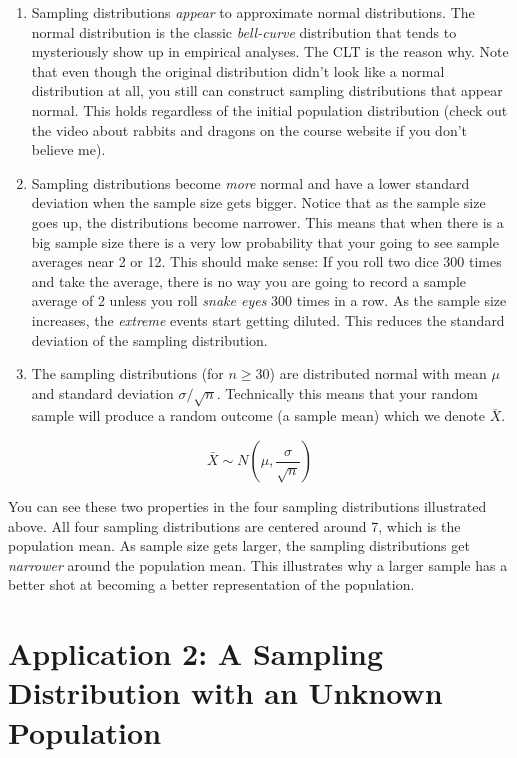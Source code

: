 \documentclass[
]{book}
\begin{document}
\begin{enumerate}
\def\labelenumi{\arabic{enumi}.}
\item
  Sampling distributions \emph{appear} to approximate normal distributions. The normal distribution is the classic \emph{bell-curve} distribution that tends to mysteriously show up in empirical analyses. The CLT is the reason why. Note that even though the original distribution didn't look like a normal distribution at all, you still can construct sampling distributions that appear normal. This holds regardless of the initial population distribution (check out the video about rabbits and dragons on the course website if you don't believe me).
\item
  Sampling distributions become \emph{more} normal and have a lower standard deviation when the sample size gets bigger. Notice that as the sample size goes up, the distributions become narrower. This means that when there is a big sample size there is a very low probability that your going to see sample averages near 2 or 12. This should make sense: If you roll two dice 300 times and take the average, there is no way you are going to record a sample average of 2 unless you roll \emph{snake eyes} 300 times in a row. As the sample size increases, the \emph{extreme} events start getting diluted. This reduces the standard deviation of the sampling distribution.
\item
  The sampling distributions (for \(n \geq 30\)) are distributed normal with mean \(\mu\) and standard deviation \(\sigma / \sqrt{n}\). Technically this means that your random sample will produce a random outcome (a sample mean) which we denote \(\bar{X}\).
\end{enumerate}

\[ \bar{X} \sim N \left( \mu, \frac{\sigma}{\sqrt{n}} \right) \]

You can see these two properties in the four sampling distributions illustrated above. All four sampling distributions are centered around 7, which is the population mean. As sample size gets larger, the sampling distributions get \emph{narrower} around the population mean. This illustrates why a larger sample has a better shot at becoming a better representation of the population.

\hypertarget{application-2-a-sampling-distribution-with-an-unknown-population}{%
\section{Application 2: A Sampling Distribution with an Unknown Population}\label{application-2-a-sampling-distribution-with-an-unknown-population}}
\end{document}
